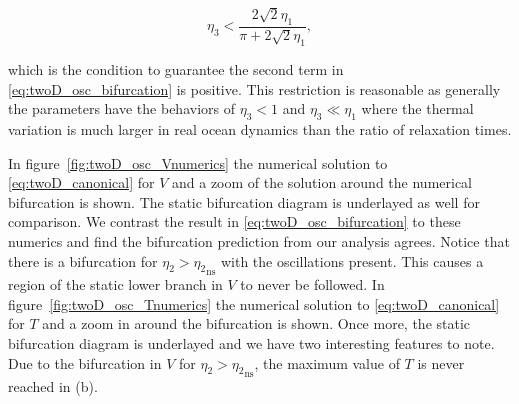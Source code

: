 \begin{equation*}
\eta_3 <\frac{2\sqrt{2}\eta_1}{\pi+2\sqrt{2}\eta_1},
\end{equation*}

which is the condition to guarantee the second term in \eqref{eq:twoD_osc_bifurcation} is positive. This restriction is reasonable as generally the parameters have the behaviors of $\eta_3<1$ and $\eta_3\ll \eta_1$ where the thermal variation is much larger in real ocean dynamics than the ratio of relaxation times.

In figure~\ref{fig:twoD_osc_Vnumerics} the numerical solution to \eqref{eq:twoD_canonical} for $V$ and a zoom of the solution around the numerical bifurcation is shown. The static bifurcation diagram is underlayed as well for comparison. We contrast the result in \eqref{eq:twoD_osc_bifurcation} to these numerics and find the bifurcation prediction from our analysis agrees. Notice that there is a bifurcation for $\eta_2>{\eta_2}_{\text{ns}}$ with the oscillations present. This causes a region of the static lower branch in $V$ to never be followed.
In figure~\ref{fig:twoD_osc_Tnumerics} the numerical solution to \eqref{eq:twoD_canonical} for $T$ and a zoom in around the bifurcation is shown. Once more, the static bifurcation diagram is underlayed and we have two interesting features to note. Due to the bifurcation in $V$ for $\eta_2>{\eta_2}_{\text{ns}}$, the maximum value of $T$ is never reached in (b).

